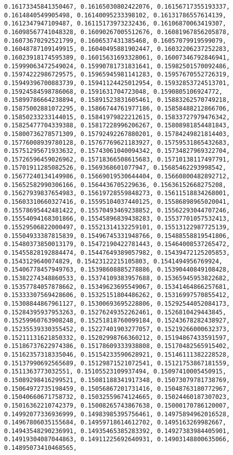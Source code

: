 \documentclass[11pt]{article}
\begin{document}
\begin{Verbatim}[commandchars=\\\{\}]
0.16173345841350467, 0.16165030802422076, 0.16156717355193337, 0.1614840549905498, 0.16140095233398102, 0.16131786557614139, 0.1612347947109487, 0.16115173973232436, 0.16106870063419307, 0.16098567741048328, 0.16090267005512676, 0.16081967856205878, 0.16073670292521799, 0.1606537431385468, 0.16057079919599079, 0.16048787109149915, 0.16040495881902447, 0.16032206237252283, 0.16023918174595389, 0.16015631693328061, 0.16007346792846941, 0.15999063472549024, 0.15990781731831641, 0.15982501570092486, 0.15974222986729575, 0.15965945981141283, 0.15957670552726319, 0.15949396700883739, 0.15941124425012954, 0.15932853724513701, 0.15924584598786068, 0.1591631704723048, 0.1590805106924772, 0.15899786664238894, 0.15891523831605461, 0.15883262570749218, 0.15875002881072295, 0.15866744761977186, 0.15858488212866706, 0.15850233233144015, 0.15841979822212615, 0.15833727979476342, 0.15825477704339388, 0.15817228996206267, 0.15808981854481843, 0.15800736278571309, 0.15792492267880201, 0.15784249821814403, 0.15776008939780128, 0.15767769621183927, 0.15759531865432683, 0.15751295671933632, 0.15743061040094342, 0.15734827969322704, 0.15726596459026962, 0.15718366508615683, 0.15710138117497791, 0.15701911285082526, 0.1569368601077947, 0.15685462293998542, 0.15677240134149986, 0.15669019530644404, 0.15660800482892712, 0.15652582990306166, 0.1564436705229636, 0.15636152668275208, 0.15627939837654983, 0.15619728559848273, 0.15611518834268001, 0.15603310660327416, 0.15595104037440125, 0.15586898965020041, 0.15578695442481422, 0.15570493469238852, 0.15562293044707246, 0.15554094168301866, 0.15545896839438283, 0.15537701057532413, 0.15529506822000497, 0.15521314132259101, 0.15513122987725139, 0.15504933387815839, 0.15496745331948766, 0.15488558819541806, 0.15480373850013179, 0.15472190422781443, 0.15464008537265472, 0.15455828192884474, 0.15447649389057982, 0.15439472125205853, 0.1543129640074829, 0.15423122215105803, 0.1541494956769924, 0.15406778457949763, 0.15398608885278886, 0.15390440849108428, 0.15382274348860533, 0.15374109383957688, 0.15365945953822682, 0.15357784057878662, 0.15349623695549067, 0.15341464866257681, 0.15333307569428606, 0.15325151804486262, 0.15316997570855412, 0.15308844867961127, 0.15300693695228806, 0.15292544052084173, 0.15284395937953263, 0.15276249352262461, 0.1526810429443845, 0.15259960763908248, 0.15251818760099184, 0.15243678282438927, 0.15235539330355452, 0.15227401903277057, 0.15219266000632373, 0.15211131621850332, 0.15202998766360212, 0.15194867433591597, 0.15186737622974386, 0.15178609333938808, 0.15170482565915402, 0.15162357318335046, 0.15154233590628921, 0.15146111382228528, 0.15137990692565689, 0.15129871521072541, 0.15121753867181559, 0.1511363773032551, 0.15105523109937494, 0.15097410005450915, 0.15089298416299521, 0.15081188341917348, 0.15073079781738769, 0.15064972735198459, 0.15056867201731416, 0.15048763180772967, 0.15040660671758732, 0.15032559674124665, 0.15024460187307023, 0.15016362210742379, 0.15008265743867638, 0.15000170786120007, 0.14992077336936999, 0.14983985395756461, 0.14975894962016528, 0.14967806035155684, 0.14959718614612702, 0.1495163269982667, 0.14943548290236991, 0.14935465385283392, 0.14927383984405901, 0.14919304087044863, 0.14911225692640931, 0.14903148800635066, 0.14895073410468565, 
\end{Verbatim}
\end{document}
